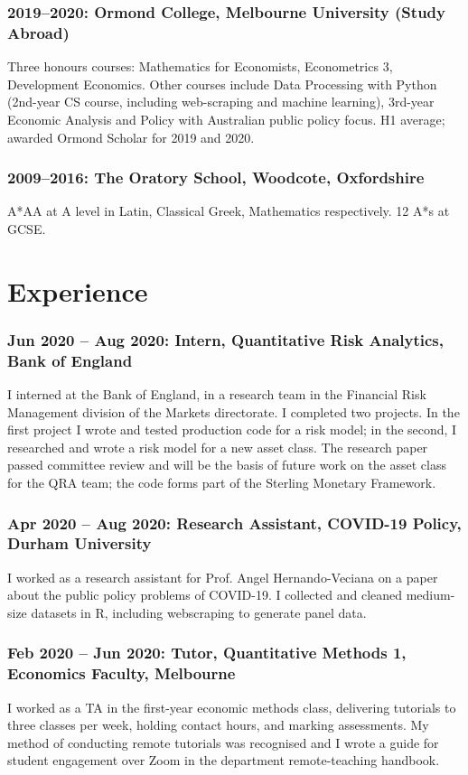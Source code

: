 \documentclass[a4]{article}
\begin{document}
\subsubsection*{2019--2020: Ormond College, Melbourne University (Study Abroad)}
Three honours courses: Mathematics for Economists, Econometrics 3, Development Economics. Other courses include Data Processing with Python (2nd-year CS course, including web-scraping and machine learning), 3rd-year Economic Analysis and Policy with Australian public policy focus. H1 average; awarded Ormond Scholar for 2019 and 2020.

\subsubsection*{2009--2016: The Oratory School, Woodcote, Oxfordshire}
A*AA at A level in Latin, Classical Greek, Mathematics respectively. 12 A*s at GCSE.
  
\section*{Experience}

\subsubsection*{Jun 2020 -- Aug 2020: Intern, Quantitative Risk Analytics, Bank of England}
I interned at the Bank of England, in a research team in the Financial Risk Management division of the Markets directorate. I completed two projects. In the first project I wrote and tested production code for a risk model; in the second, I researched and wrote a risk model for a new asset class. The research paper passed committee review and will be the basis of future work on the asset class for the QRA team; the code forms part of the Sterling Monetary Framework. 

\subsubsection*{Apr 2020 -- Aug 2020: Research Assistant, COVID-19 Policy, Durham University}
I worked as a research assistant for Prof. Angel Hernando-Veciana on a paper about the public policy problems of COVID-19. I collected and cleaned medium-size datasets in R, including webscraping to generate panel data.%

\subsubsection*{Feb 2020 -- Jun 2020: Tutor, Quantitative Methods 1, Economics Faculty, Melbourne}
I worked as a TA in the first-year economic methods class, delivering tutorials to three classes per week, holding contact hours, and marking assessments. My method of conducting remote tutorials was recognised and I wrote a guide for student engagement over Zoom in the department remote-teaching handbook.
\end{document}
